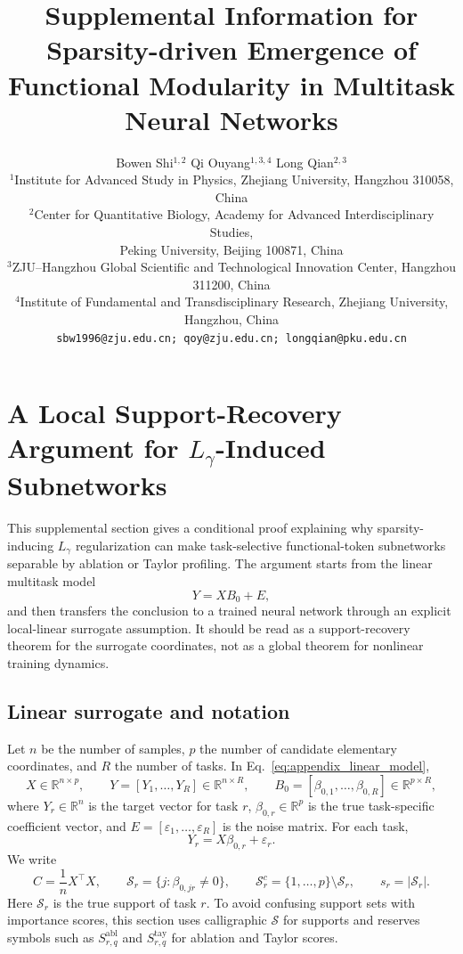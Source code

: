 \documentclass{article}
\title{Supplemental Information for\\Sparsity-driven Emergence of Functional Modularity in Multitask Neural Networks}
\author{Bowen Shi$^{1,2}$ \quad Qi Ouyang$^{1,3,4}$ \quad Long Qian$^{2,3}$\\
\small $^1$Institute for Advanced Study in Physics, Zhejiang University, Hangzhou 310058, China\\
\small $^2$Center for Quantitative Biology, Academy for Advanced Interdisciplinary Studies,\\
\small Peking University, Beijing 100871, China\\
\small $^3$ZJU--Hangzhou Global Scientific and Technological Innovation Center, Hangzhou 311200, China\\
\small $^4$Institute of Fundamental and Transdisciplinary Research, Zhejiang University, Hangzhou, China\\
\texttt{sbw1996@zju.edu.cn; qoy@zju.edu.cn; longqian@pku.edu.cn}
}
\begin{document}
\maketitle

\setcounter{section}{0}
\setcounter{equation}{0}
\setcounter{figure}{0}
\setcounter{table}{0}
\renewcommand{\thesection}{S\arabic{section}}
\renewcommand{\thesubsection}{\thesection.\arabic{subsection}}
\renewcommand{\thesubsubsection}{\thesubsection.\arabic{subsubsection}}
\renewcommand{\theequation}{S.\arabic{equation}}
\renewcommand{\thefigure}{S\arabic{figure}}
\renewcommand{\thetable}{S\arabic{table}}

\section{A Local Support-Recovery Argument for \(L_\gamma\)-Induced Subnetworks}
\label{appendix:lgamma_subnetwork_recovery}
\label{appendix:proofLasso}

This supplemental section gives a conditional proof explaining why sparsity-inducing \(L_\gamma\) regularization can make task-selective functional-token subnetworks separable by ablation or Taylor profiling. The argument starts from the linear multitask model
\begin{equation}
Y=XB_0+E,
\label{eq:appendix_linear_model}
\end{equation}
and then transfers the conclusion to a trained neural network through an explicit local-linear surrogate assumption. It should be read as a support-recovery theorem for the surrogate coordinates, not as a global theorem for nonlinear training dynamics.

\subsection{Linear surrogate and notation}

Let \(n\) be the number of samples, \(p\) the number of candidate elementary coordinates, and \(R\) the number of tasks. In Eq.~\eqref{eq:appendix_linear_model},
\begin{equation}
X\in\mathbb R^{n\times p},\qquad
Y=[Y_1,\ldots,Y_R]\in\mathbb R^{n\times R},\qquad
B_0=[\beta_{0,1},\ldots,\beta_{0,R}]\in\mathbb R^{p\times R},
\end{equation}
where \(Y_r\in\mathbb R^n\) is the target vector for task \(r\), \(\beta_{0,r}\in\mathbb R^p\) is the true task-specific coefficient vector, and \(E=[\varepsilon_1,\ldots,\varepsilon_R]\) is the noise matrix. For each task,
\begin{equation}
Y_r=X\beta_{0,r}+\varepsilon_r .
\end{equation}
We write
\begin{equation}
C=\frac{1}{n}X^\top X,
\qquad
\mathcal S_r=\{j:\beta_{0,jr}\ne0\},
\qquad
\mathcal S_r^c=\{1,\ldots,p\}\setminus\mathcal S_r,
\qquad
s_r=|\mathcal S_r|.
\end{equation}
Here \(\mathcal S_r\) is the true support of task \(r\). To avoid confusing support sets with importance scores, this section uses calligraphic \(\mathcal S\) for supports and reserves symbols such as \(S^{\mathrm{abl}}_{r,q}\) and \(S^{\mathrm{tay}}_{r,q}\) for ablation and Taylor scores.
\end{document}

